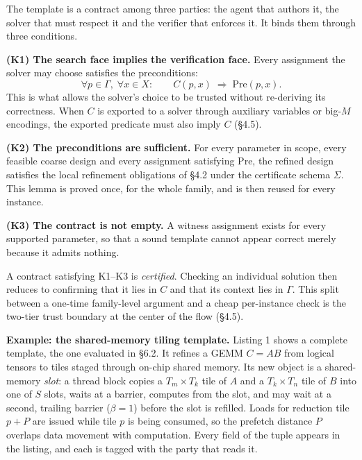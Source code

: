 \documentclass[11pt]{article}
\begin{document}
The template is a contract among three parties: the agent that authors it, the solver that must respect it and the verifier that enforces it. It binds them through three conditions.

\textbf{(K1) The search face implies the verification face.} Every assignment the solver may choose satisfies the preconditions:
\[
\forall p\in\Gamma,\;\forall x\in X:\qquad C(p,x)\;\Longrightarrow\;\mathrm{Pre}(p,x).
\]
This is what allows the solver's choice to be trusted without re-deriving its correctness. When \(C\) is exported to a solver through auxiliary variables or big-\(M\) encodings, the exported predicate must also imply \(C\) (§4.5).

\textbf{(K2) The preconditions are sufficient.} For every parameter in scope, every feasible coarse design and every assignment satisfying \(\mathrm{Pre}\), the refined design satisfies the local refinement obligations of §4.2 under the certificate schema \(\Sigma\). This lemma is proved once, for the whole family, and is then reused for every instance.

\textbf{(K3) The contract is not empty.} A witness assignment exists for every supported parameter, so that a sound template cannot appear correct merely because it admits nothing.

A contract satisfying K1--K3 is \emph{certified}. Checking an individual solution then reduces to confirming that it lies in \(C\) and that its context lies in \(\Gamma\). This split between a one-time family-level argument and a cheap per-instance check is the two-tier trust boundary at the center of the flow (§4.5).

\textbf{Example: the shared-memory tiling template.} Listing 1 shows a complete template, the one evaluated in §6.2. It refines a GEMM \(C=AB\) from logical tensors to tiles staged through on-chip shared memory. Its new object is a shared-memory \emph{slot}: a thread block copies a \(T_m\times T_k\) tile of \(A\) and a \(T_k\times T_n\) tile of \(B\) into one of \(S\) slots, waits at a barrier, computes from the slot, and may wait at a second, trailing barrier (\(\beta=1\)) before the slot is refilled. Loads for reduction tile \(p+P\) are issued while tile \(p\) is being consumed, so the prefetch distance \(P\) overlaps data movement with computation. Every field of the tuple appears in the listing, and each is tagged with the party that reads it.
\end{document}
